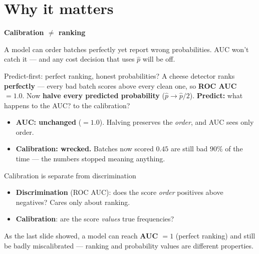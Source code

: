 \documentclass[aspectratio=169]{beamer}
\begin{document}
\section{Why it matters}

\begin{frame}[plain]
  \vfill
  \begin{center}
    {\Large\color{popblue}\textbf{Calibration $\neq$ ranking}}\\[0.9em]
    \begin{minipage}{0.82\textwidth}\centering\small
      A model can order batches perfectly yet report wrong probabilities. AUC won't catch it
      --- and any cost decision that uses $\hat p$ will be off.
    \end{minipage}
  \end{center}
  \vfill
\end{frame}

\begin{frame}{Predict-first: perfect ranking, honest probabilities?}
  A cheese detector ranks \textbf{perfectly} --- every bad batch scores above every clean one,
  so \textbf{ROC AUC $= 1.0$}. Now \textbf{halve every predicted probability}
  ($\hat p \to \hat p / 2$).
  \vfill
  \textbf{Predict:} what happens to the AUC? to the calibration?
  \vfill
  \begin{itemize}\small
    \item \textbf{AUC: unchanged} ($=1.0$). Halving preserves the \emph{order}, and AUC sees
      only order.
    \item \textbf{Calibration: wrecked.} Batches now scored $0.45$ are still bad $90\%$ of the
      time --- the numbers stopped meaning anything.
  \end{itemize}
  \vfill
\end{frame}

\begin{frame}{Calibration is separate from discrimination}
  \begin{itemize}
    \item \textbf{Discrimination} (ROC AUC): does the score \emph{order} positives above
      negatives? Cares only about ranking.
    \item \textbf{Calibration}: are the score \emph{values} true frequencies?
  \end{itemize}
  \vfill
  As the last slide showed, a model can reach \textbf{AUC $=1$} (perfect ranking) and still be
  badly miscalibrated --- ranking and probability values are different properties.
  \vfill
\end{frame}
\end{document}
